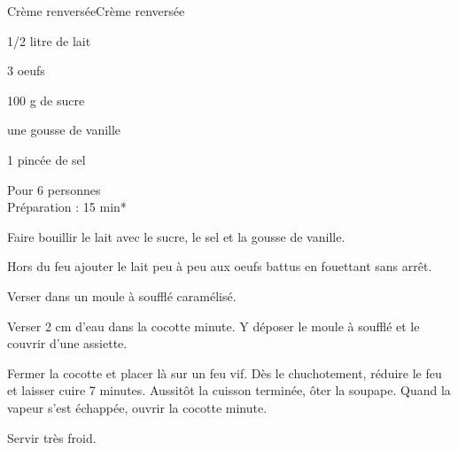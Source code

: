 \begin{recette}{Crème renversée}{Crème renversée}

\begin{ingredients}
1/2 litre de lait\par
3 oeufs\par
100 g de sucre\par
une gousse de vanille\par
1 pincée de sel\par
\end{ingredients}

\begin{infos}
Pour 6 personnes\\
Préparation : 15 min*		\\
\end{infos}

\begin{etapes}
\item %
\item %
\item %
\item Faire bouillir le lait avec le sucre, le sel et la gousse de vanille.
\item Hors du feu ajouter le lait peu à peu aux oeufs battus en fouettant sans arrêt.
\item Verser dans un moule à soufflé caramélisé.
\item Verser 2 cm d'eau dans la cocotte minute. Y déposer le moule à soufflé et le couvrir d'une assiette.
\item Fermer la cocotte et placer là sur un feu vif. Dès le chuchotement, réduire le feu et laisser cuire 7 minutes. Aussitôt la cuisson terminée, ôter la soupape. Quand la vapeur s'est échappée, ouvrir la cocotte minute.
\end{etapes}

\begin{conseils}
Servir très froid.
\end{conseils}

\end{recette}